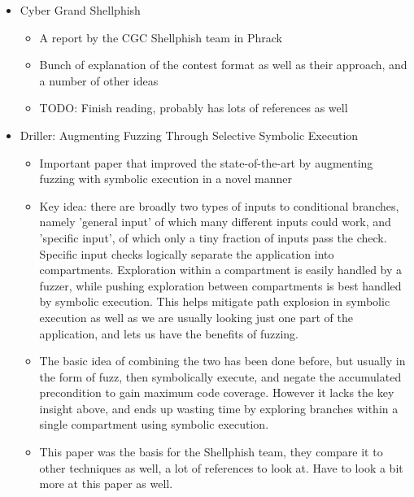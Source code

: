 \documentclass[11pt]{article}
\begin{document}
\begin{itemize}
\item
    Cyber Grand Shellphish \cite{CGS}
    \begin{itemize}
    \item
        A report by the CGC Shellphish team in Phrack
    \item
        Bunch of explanation of the contest format as well as their approach,
        and a number of other ideas
    \item
        TODO: Finish reading, probably has lots of references as well
    \end{itemize}

\item
    Driller: Augmenting Fuzzing Through Selective Symbolic Execution
    \cite{DRILLER}
    \begin{itemize}
    \item
        Important paper that improved the state-of-the-art by augmenting
        fuzzing with symbolic execution in a novel manner
    \item
        Key idea: there are broadly two types of inputs to conditional
        branches, namely 'general input' of which many different inputs could
        work, and 'specific input', of which only a tiny fraction of inputs
        pass the check. Specific input checks logically separate the application
        into compartments. Exploration within a compartment is easily handled
        by a fuzzer, while pushing exploration between compartments is best
        handled by symbolic execution. This helps mitigate path explosion in
        symbolic execution as well as we are usually looking just one part of
        the application, and lets us have the benefits of fuzzing.
    \item
        The basic idea of combining the two has been done before, but usually
        in the form of fuzz, then symbolically execute, and negate the
        accumulated precondition to gain maximum code coverage. However it lacks
        the key insight above, and ends up wasting time by exploring branches
        within a single compartment using symbolic execution.
    \item
        This paper was the basis for the Shellphish team, they compare it to
        other techniques as well, a lot of references to look at. Have to look
        a bit more at this paper as well.
    \end{itemize}
\end{itemize}
\end{document}
